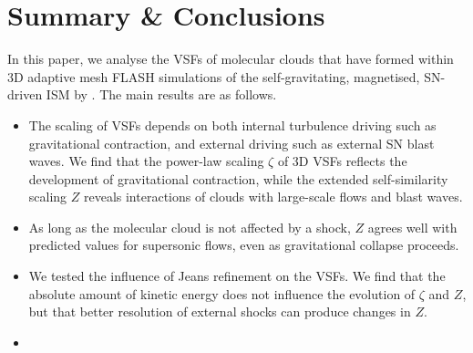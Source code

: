 \section{Summary \& Conclusions}\label{conclusions}

In this paper, we analyse the 
    VSFs 
of molecular clouds that have formed within 3D adaptive mesh FLASH simulations of the self-gravitating, magnetised, SN-driven ISM by .
The main results are as follows.

\begin{itemize}
\item The scaling of 
     VSFs depends on both internal turbulence driving such as gravitational contraction, 
     and external driving such as external SN blast waves.
     We find that the power-law scaling $\zeta$ of 3D VSFs reflects the development 
     of gravitational contraction, while the extended self-similarity scaling $Z$ 
     reveals interactions of clouds with large-scale flows and blast waves.
\item As long as the molecular cloud is not affected by a shock, $Z$ 
    agrees well
with predicted values for supersonic flows, 
      even as gravitational collapse proceeds.
\item We tested the influence of Jeans refinement on the VSFs. We find that the absolute amount of kinetic energy does not influence the evolution of $\zeta$ and $Z$, %
   but that better resolution of external shocks can produce changes in $Z$.
\item 

\end{itemize}
